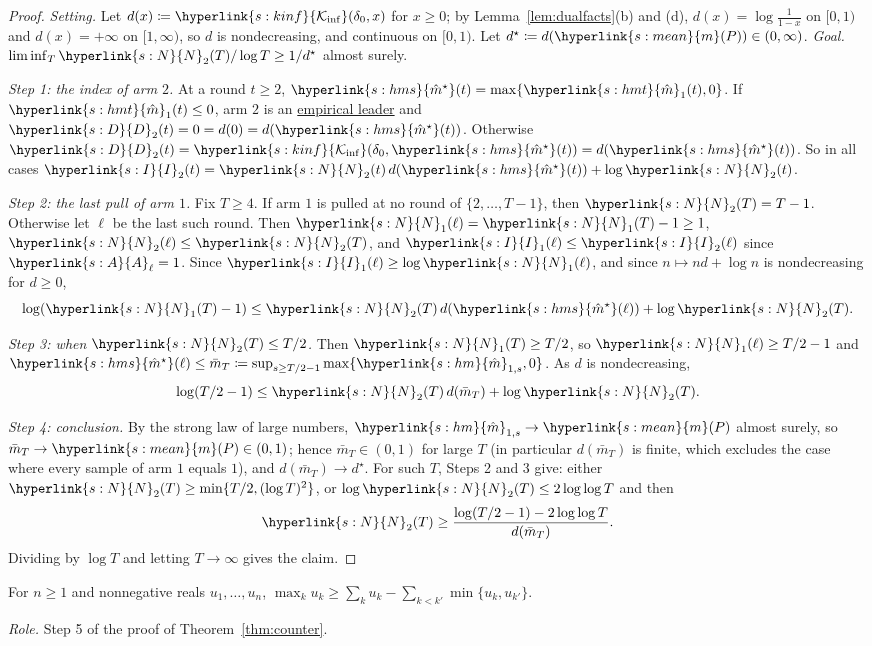 \documentclass[11pt]{article}
\newcommand{\sy}[2]{{\hyperlink{#1}{#2}}}
\newcommand{\term}[2]{\hyperlink{#1}{#2}}
\newcommand{\mean}{\sy{s:mean}{m}}
\newcommand{\Kinf}{\sy{s:kinf}{\mathcal{K}_{\inf}}}
\newcommand{\Ap}{\sy{s:A}{A}}
\newcommand{\Np}{\sy{s:N}{N}}
\newcommand{\hm}{\sy{s:hm}{\hat{m}}}
\newcommand{\hmt}{\sy{s:hmt}{\hat{m}}}
\newcommand{\hms}{\sy{s:hms}{\hat{m}^{\star}}}
\newcommand{\Dv}{\sy{s:D}{D}}
\newcommand{\Ix}{\sy{s:I}{I}}
\begin{document}
\begin{proof}
\emph{Setting.} Let $d(x)\coloneqq\Kinf(\delta_0,x)$ for $x\ge0$; by Lemma~\ref{lem:dualfacts}(b)
and (d), $d(x)=\log\frac1{1-x}$ on $[0,1)$ and $d(x)=+\infty$ on $[1,\infty)$, so $d$ is
nondecreasing, and continuous on $[0,1)$. Let $d^\star\coloneqq d(\mean(P))\in(0,\infty)$.
\emph{Goal.} $\liminf_T\Np_2(T)/\log T\ge1/d^\star$ almost surely.

\emph{Step 1: the index of arm $2$.} At a round $t\ge2$, $\hms(t)=\max\{\hmt_1(t),0\}$. If
$\hmt_1(t)\le0$, arm $2$ is an \term{w:leader}{empirical leader} and $\Dv_2(t)=0=d(0)=d(\hms(t))$. Otherwise
$\Dv_2(t)=\Kinf(\delta_0,\hms(t))=d(\hms(t))$. So in all cases
$\Ix_2(t)=\Np_2(t)\,d(\hms(t))+\log \Np_2(t)$.

\emph{Step 2: the last pull of arm $1$.} Fix $T\ge4$. If arm $1$ is pulled at no round of
$\{2,\dots,T-1\}$, then $\Np_2(T)=T-1$. Otherwise let $\ell$ be the last such round. Then
$\Np_1(\ell)=\Np_1(T)-1\ge1$, $\Np_2(\ell)\le \Np_2(T)$, and $\Ix_1(\ell)\le \Ix_2(\ell)$ since $\Ap_\ell=1$. Since
$\Ix_1(\ell)\ge\log \Np_1(\ell)$, and since $n\mapsto nd+\log n$ is nondecreasing for $d\ge0$,
\[
  \log(\Np_1(T)-1)\le \Np_2(T)\,d(\hms(\ell))+\log \Np_2(T).
\]

\emph{Step 3: when $\Np_2(T)\le T/2$.} Then $\Np_1(T)\ge T/2$, so $\Np_1(\ell)\ge T/2-1$ and
$\hms(\ell)\le\bar m_T\coloneqq\sup_{s\ge T/2-1}\max\{\hm_{1,s},0\}$. As $d$ is nondecreasing,
\[
  \log(T/2-1)\le \Np_2(T)\,d(\bar m_T)+\log \Np_2(T).
\]

\emph{Step 4: conclusion.} By the strong law of large numbers, $\hm_{1,s}\to \mean(P)$ almost surely, so
$\bar m_T\to \mean(P)\in(0,1)$; hence $\bar m_T\in(0,1)$ for large $T$ (in particular $d(\bar m_T)$ is
finite, which excludes the case where every sample of arm $1$ equals $1$), and
$d(\bar m_T)\to d^\star$. For such $T$, Steps 2 and 3 give: either $\Np_2(T)\ge\min\{T/2,(\log T)^2\}$,
or $\log \Np_2(T)\le2\log\log T$ and then
\[
  \Np_2(T)\ge\frac{\log(T/2-1)-2\log\log T}{d(\bar m_T)}.
\]
Dividing by $\log T$ and letting $T\to\infty$ gives the claim.
\end{proof}

\begin{lemma}\label{lem:pairs}
For $n\ge1$ and nonnegative reals $u_1,\dots,u_n$,
$\max_ku_k\ge\sum_ku_k-\sum_{k<k'}\min\{u_k,u_{k'}\}$.
\end{lemma}

\emph{Role.} Step 5 of the proof of Theorem~\ref{thm:counter}.
\end{document}
